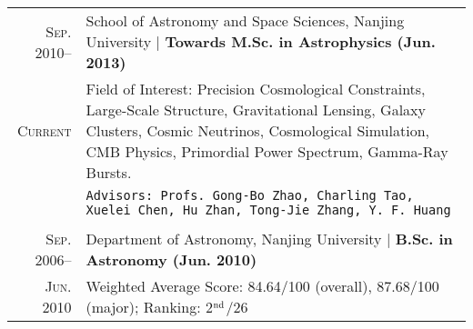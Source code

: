 \documentclass[10pt]{article}
\begin{document}
\begin{tabular}{r|p{17.5cm}}
\textsc{Sep. 2010}--     &   School of Astronomy and Space Sciences, Nanjing University  |  \textbf{Towards M.Sc. in Astrophysics (Jun. 2013)}   \\
\textsc{Current}
& Field of Interest: Precision Cosmological Constraints, Large-Scale Structure, Gravitational Lensing, Galaxy Clusters, Cosmic Neutrinos, Cosmological Simulation, CMB Physics, Primordial Power Spectrum, Gamma-Ray Bursts. \\
&   \texttt{Advisors: Profs. Gong-Bo Zhao, Charling Tao, Xuelei Chen, Hu Zhan, Tong-Jie Zhang, Y. F. Huang}   \\
\multicolumn{2}{c}{} \\

\textsc{Sep. 2006}--     &   Department of Astronomy, Nanjing University  |  \textbf{B.Sc. in Astronomy (Jun. 2010)}    \\
\textsc{Jun. 2010}       &   Weighted Average Score: 84.64/100 (overall), 87.68/100 (major); Ranking: 2$^{\rm nd}$/26  \\
\end{tabular}


\end{document}
